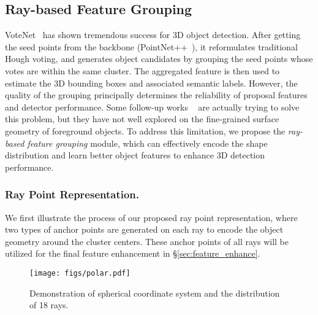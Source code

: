 \documentclass[final]{cvpr}
\begin{document}
\subsection{Ray-based Feature Grouping} \label{sec:ray_method}
VoteNet~\cite{qi2019deep} has shown tremendous success for 3D object detection. After getting the seed points from the backbone (PointNet++~\cite{qi2018pointnnetplus}), it reformulates traditional Hough voting, and generates object candidates by grouping the seed points whose votes are within the same cluster. The aggregated feature is then used to estimate the 3D bounding boxes and associated semantic labels. However, the quality of the grouping principally determines the reliability of proposal features and detector performance. Some follow-up works ~\cite{chen2020hierarchical, cheng2021back, xie2020mlcvnet} are actually trying to solve this problem, but they have not well explored on the fine-grained surface geometry of foreground objects. To address this limitation, we propose the \textit{ray-based feature grouping} module, which can effectively encode the shape distribution and learn better object features to enhance 3D detection performance.  

\subsubsection{Ray Point Representation.} \label{sec:rpr}
We first illustrate the process of our proposed ray point representation, where two types of anchor points are generated on each ray to encode the object geometry around the cluster centers. These anchor points of all rays will be utilized for the final feature enhancement in \S\ref{sec:feature_enhance}.

\begin{figure}[t]
  \centering
  \texttt{[image: figs/polar.pdf]}
  \vspace{-6pt}
   \caption{Demonstration of spherical coordinate system and the distribution of 18 rays.}
   \label{fig:polar}
  \vspace{-10pt}
\end{figure}
\end{document}
